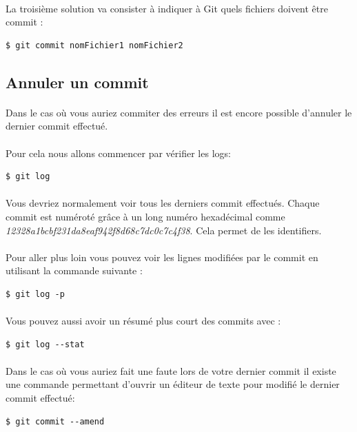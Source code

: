 \documentclass[french, a4paper, 12pt, titlepage]{article}
\begin{document}
\paragraph{}La troisième solution va consister à indiquer à Git quels fichiers doivent être commit :
\begin{lstlisting}
$ git commit nomFichier1 nomFichier2
\end{lstlisting}

\subsection{Annuler un commit}
\paragraph{}Dans le cas où vous auriez commiter des erreurs il est encore possible d'annuler le dernier commit effectué.
\paragraph{}Pour cela nous allons commencer par vérifier les logs:
\begin{lstlisting}
$ git log
\end{lstlisting}

\paragraph{}Vous devriez normalement voir tous les derniers commit effectués. Chaque commit est numéroté grâce à un long numéro hexadécimal comme \textit{12328a1bcbf231da8eaf942f8d68c7dc0c7c4f38}. 
Cela permet de les identifiers.

\paragraph{}Pour aller plus loin vous pouvez voir les lignes modifiées par le commit en utilisant la commande suivante :
\begin{lstlisting}
$ git log -p
\end{lstlisting}
\paragraph{}Vous pouvez aussi avoir un résumé plus court des commits avec :
\begin{lstlisting}
$ git log --stat
\end{lstlisting}

\paragraph{}Dans le cas où vous auriez fait une faute lors de votre dernier commit il existe une commande permettant d'ouvrir un éditeur de texte pour modifié le dernier commit effectué:
\begin{lstlisting}
$ git commit --amend
\end{lstlisting}
\end{document}
